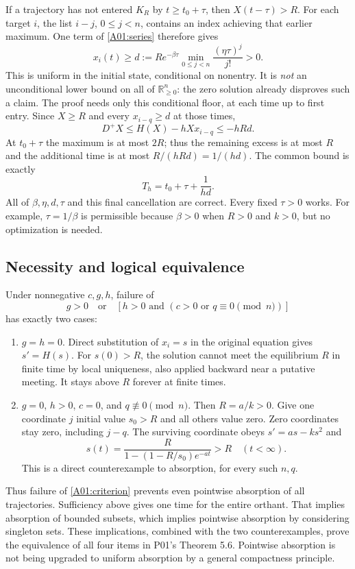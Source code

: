 \documentclass[11pt]{article}
\newcommand{\RR}{\mathbb R}
\newcommand{\Orth}{\RR_{\geq0}^{n}}
\begin{document}
If a trajectory has not entered $K_R$ by $t\geq t_0+\tau$, then
$X(t-\tau)>R$. For each target $i$, the list $i-j$, $0\leq j<n$,
contains an index achieving that earlier maximum. One term of
\eqref{A01:series} therefore gives
\begin{equation}\label{A01:d}
 x_i(t)\geq d:=R e^{-\beta\tau}
       \min_{0\leq j<n}\frac{(\eta\tau)^j}{j!}>0.
\end{equation}
This is uniform in the initial state, conditional on nonentry. It is
\emph{not} an unconditional lower bound on all of $\Orth$: the zero
solution already disproves such a claim. The proof needs only this
conditional floor, at each time up to first entry. Since $X\geq R$
and every $x_{i-q}\geq d$ at those times,
\[
 D^+X\leq H(X)-hXx_{i-q}\leq-hRd.
\]
At $t_0+\tau$ the maximum is at most $2R$; thus the remaining excess
is at most $R$ and the additional time is at most
$R/(hRd)=1/(hd)$. The common bound is exactly
\begin{equation}\label{A01:Th}
 T_h=t_0+\tau+\frac1{hd}.
\end{equation}
All of $\beta,\eta,d,\tau$ and this final cancellation are correct.
Every fixed $\tau>0$ works. For example, $\tau=1/\beta$ is permissible
because $\beta>0$ when $R>0$ and $k>0$, but no optimization is needed.

\subsection{Necessity and logical equivalence}
Under nonnegative $c,g,h$, failure of
\begin{equation}\label{A01:criterion}
 g>0\quad\text{or}\quad
 [h>0\text{ and }(c>0\text{ or }q\equiv0\pmod n)]
\end{equation}
has exactly two cases:
\begin{enumerate}
\item $g=h=0$. Direct substitution of $x_i=s$ in the original equation
gives $s'=H(s)$. For $s(0)>R$, the solution cannot meet the equilibrium
$R$ in finite time by local uniqueness, also applied backward near a
putative meeting. It stays above $R$ forever at finite times.
\item $g=0$, $h>0$, $c=0$, and $q\not\equiv0\pmod n$.
Then $R=a/k>0$. Give one coordinate $j$ initial value $s_0>R$ and
all others value zero. Zero coordinates stay zero, including $j-q$.
The surviving coordinate obeys $s'=as-ks^2$ and
\[
 s(t)=\frac{R}{1-(1-R/s_0)e^{-at}}>R\quad(t<\infty).
\]
This is a direct counterexample to absorption, for every such $n,q$.
\end{enumerate}
Thus failure of \eqref{A01:criterion} prevents even pointwise absorption
of all trajectories. Sufficiency above gives one time for the entire
orthant. That implies absorption of bounded subsets, which implies
pointwise absorption by considering singleton sets. These implications,
combined with the two counterexamples, prove the equivalence of all four
items in P01's Theorem 5.6. Pointwise absorption is not being upgraded
to uniform absorption by a general compactness principle.
\end{document}
